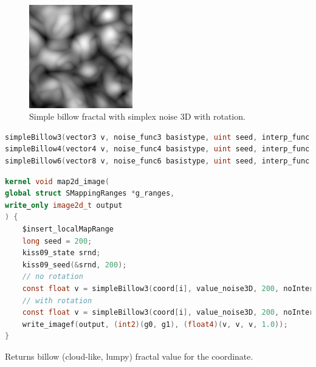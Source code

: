 \begin{figure}[h]
\centering
\includegraphics[width=0.4\textwidth]{out/simpleBillow3/simpleBillow3_simplex_noise3D_noInterp_rot.png}
\caption{Simple billow fractal with simplex noise 3D with rotation.}
\label{fig:simple_billow3_simplex_noise3D_noInterp_rot}
\end{figure}

\begin{lstlisting}[caption={Definition of simple billow fractal functions},label={lst:simple_billow_definition},language=OpenCL]
simpleBillow3(vector3 v, noise_func3 basistype, uint seed, interp_func interp, random_func rnd, void *srnd, uint numoctaves, REAL frequency, bool rot);
simpleBillow4(vector4 v, noise_func4 basistype, uint seed, interp_func interp, random_func rnd, void *srnd, uint numoctaves, REAL frequency, bool rot);
simpleBillow6(vector8 v, noise_func6 basistype, uint seed, interp_func interp, random_func rnd, void *srnd, uint numoctaves, REAL frequency, bool rot);
\end{lstlisting}

\begin{lstlisting}[caption={Example for simple billow fractal functions},label={lst:simple_billow_example},language=OpenCL]
kernel void map2d_image(
global struct SMappingRanges *g_ranges,
write_only image2d_t output
) {
    $insert_localMapRange
    long seed = 200;
    kiss09_state srnd;
    kiss09_seed(&srnd, 200);
    // no rotation
    const float v = simpleBillow3(coord[i], value_noise3D, 200, noInterp, random_kiss09, &srnd, 3, 0.125, false);
    // with rotation
    const float v = simpleBillow3(coord[i], value_noise3D, 200, noInterp, random_kiss09, &srnd, 3, 0.125, true);
    write_imagef(output, (int2)(g0, g1), (float4)(v, v, v, 1.0));
}
\end{lstlisting}

Returns billow (cloud-like, lumpy) fractal value for the coordinate.


